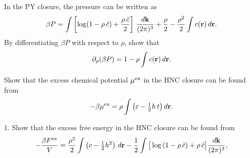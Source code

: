 \documentclass[12pt]{book}
\begin{document}

In the PY closure, the pressure can be written as\cite{baxterpressure}
\begin{align}
  \beta P =  \int \left[
    \log(1-\rho \,\tilde{c}) + \frac{ \rho \, \tilde{c} }{2}
  \right] \, \frac{ d \boldsymbol{\mathbf{k}} }{(2\pi)^3}
  +
  \frac{\rho}{2}
  - \frac{\rho^2}{2} \int c(\boldsymbol{\mathbf{r}}) \, d\boldsymbol{\mathbf{r}}.
  \label{eq:Pbaxter}
\end{align}
%
By differentiating $\beta P$ with respect to $\rho$,
show that
\begin{align}
  \partial_\rho (\beta P) = 1 - \rho \int c(\boldsymbol{\mathbf{r}}) \, d\boldsymbol{\mathbf{r}}.
\end{align}





Show that the excess chemical potential ${ { \mu }^{ \mathrm{ex} } }$ in the HNC closure
can be found from\cite{morita1960, singer1985}
\begin{equation}
  -\beta { { \mu }^{ \mathrm{ex} } } = \rho \int \left( c - \tfrac{1}{2} h \, t\right) d\boldsymbol{\mathbf{r}}.
  \label{eq:muexhnc}
\end{equation}




1. Show that the excess free energy in the HNC closure
can be found from\cite{morita1958, morita1960, singer1985}
\begin{align}
    - \frac{ \beta { { F }^{ \mathrm{ex} } } } { V }
    = \frac{\rho^2}{2} \int \left( c - \tfrac{1}{2} h^2 \right) \, d\boldsymbol{\mathbf{r}}
      - \frac{1}{2} \int  \big[
              \log\left( 1 - \rho \, \tilde{c} \right)
                           + \rho \, \tilde{c}
                         \big]  \frac{ d \boldsymbol{\mathbf{k}} }{(2\pi)^3},
\label{eq:Fexhnc}
\end{align}
\end{document}
